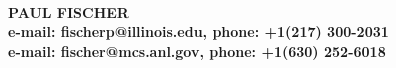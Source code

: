 \documentclass[11pt,letterpaper,english]{article}
\begin{document}
\setlength{\parindent}{0in} %

\pagestyle{fancy}   \renewcommand{%
\headrulewidth}{0.0pt}

\\
{\bf PAUL FISCHER}\\
{\bf e-mail: fischerp@illinois.edu, phone: +1(217) 300-2031}\\
{\bf e-mail: fischer@mcs.anl.gov, phone: +1(630) 252-6018}\\
 \smallskip
\end{document}
